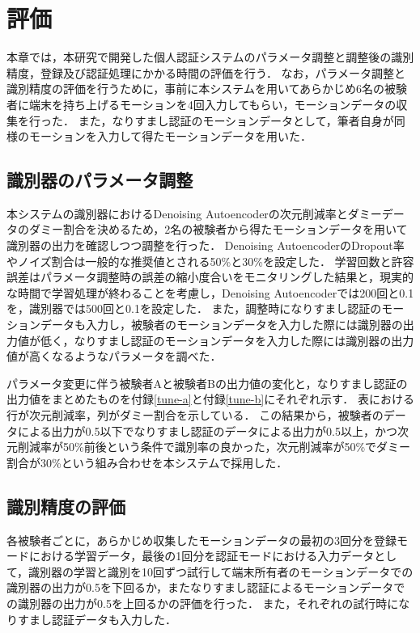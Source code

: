 \chapter{評価}
本章では，本研究で開発した個人認証システムのパラメータ調整と調整後の識別精度，登録及び認証処理にかかる時間の評価を行う．
なお，パラメータ調整と識別精度の評価を行うために，事前に本システムを用いてあらかじめ6名の被験者に端末を持ち上げるモーションを4回入力してもらい，モーションデータの収集を行った．
また，なりすまし認証のモーションデータとして，筆者自身が同様のモーションを入力して得たモーションデータを用いた．

\section{識別器のパラメータ調整}
本システムの識別器におけるDenoising Autoencoderの次元削減率とダミーデータのダミー割合を決めるため，2名の被験者から得たモーションデータを用いて識別器の出力を確認しつつ調整を行った．
Denoising AutoencoderのDropout率やノイズ割合は一般的な推奨値とされる50\%と30\%を設定した．
学習回数と許容誤差はパラメータ調整時の誤差の縮小度合いをモニタリングした結果と，現実的な時間で学習処理が終わることを考慮し，Denoising Autoencoderでは200回と0.1を，識別器では500回と0.1を設定した．
また，調整時になりすまし認証のモーションデータも入力し，被験者のモーションデータを入力した際には識別器の出力値が低く，なりすまし認証のモーションデータを入力した際には識別器の出力値が高くなるようなパラメータを調べた．

パラメータ変更に伴う被験者Aと被験者Bの出力値の変化と，なりすまし認証の出力値をまとめたものを付録\ref{tune-a}と付録\ref{tune-b}にそれぞれ示す．
表における行が次元削減率，列がダミー割合を示している．
この結果から，被験者のデータによる出力が0.5以下でなりすまし認証のデータによる出力が0.5以上，かつ次元削減率が50\%前後という条件で識別率の良かった，次元削減率が50\%でダミー割合が30\%という組み合わせを本システムで採用した．

\section{識別精度の評価}
各被験者ごとに，あらかじめ収集したモーションデータの最初の3回分を登録モードにおける学習データ，最後の1回分を認証モードにおける入力データとして，識別器の学習と識別を10回ずつ試行して端末所有者のモーションデータでの識別器の出力が0.5を下回るか，またなりすまし認証によるモーションデータでの識別器の出力が0.5を上回るかの評価を行った．
また，それぞれの試行時になりすまし認証データも入力した．

